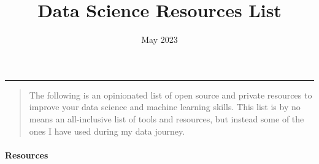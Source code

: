 \documentclass[
]{article}
\title{Data Science Resources List}
\author{}
\date{\vspace{-2.5em}May 2023}
\begin{document}
\maketitle

\begin{center}\rule{0.5\linewidth}{0.5pt}\end{center}

\begin{quote}
The following is an opinionated list of open source and private
resources to improve your data science and machine learning skills. This
list is by no means an all-inclusive list of tools and resources, but
instead some of the ones I have used during my data journey.
\end{quote}

\hypertarget{resources}{%
\paragraph{Resources}\label{resources}}
\end{document}
